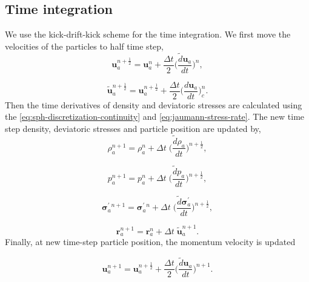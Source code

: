 \documentclass[preprint,12pt]{elsarticle}
\newcommand{\teng}[1]{\ensuremath{\boldsymbol{#1}}}
\newcommand{\ten}[1]{\ensuremath{\mathbf{#1}}}
\begin{document}
\subsection{Time integration}

We use the kick-drift-kick scheme for the time integration. We first move the
velocities of the particles to half time step,
\begin{equation}
  \label{eq:velocity-update-stage-1}
  \ten{u}_a^{n+\frac{1}{2}} = \ten{u}_a^{n} + \frac{\Delta t}{2} \bigg(\frac{\tilde{d}\ten{u}_{a}}{dt}\bigg)^n,
\end{equation}

\begin{equation}
  \label{eq:velocity-hat-update-stage-1}
  \ten{\tilde{u}}_a^{n+\frac{1}{2}} = \ten{u}_a^{n+\frac{1}{2}} + \frac{\Delta t}{2} \bigg(\frac{d\ten{u}_{a}}{dt}\bigg)^{n}_{c}.
\end{equation}
%
Then the time derivatives of density and deviatoric stresses are calculated
using the \cref{eq:sph-discretization-continuity} and
\cref{eq:jaumann-stress-rate}. The new time step density, deviatoric stresses
and particle position are updated by,
\begin{equation}
  \label{eq:density-update-stage-2}
  \rho_{a}^{n+1} = \rho_{a}^{n} + \Delta t \; \bigg(\frac{\tilde{d}\rho_{a}}{dt}\bigg)^{n+\frac{1}{2}},
\end{equation}

\begin{equation}
  \label{eq:pressure-update-stage-2}
  p_{a}^{n+1} = p_{a}^{n} + \Delta t \; \bigg(\frac{\tilde{d}p_{a}}{dt}\bigg)^{n+\frac{1}{2}},
\end{equation}

\begin{equation}
  \label{eq:stress-update-stage-2}
  \teng{\sigma}_{a}^{' \; n+1} = \teng{\sigma}_{a}^{' \; n} +
  \Delta t \; \bigg(\frac{\tilde{d}\teng{\sigma}^{'}_{a}}{dt}\bigg)^{n+\frac{1}{2}},
\end{equation}

\begin{equation}
  \label{eq:position-update-stage-2}
  \ten{r}_{a}^{n+1} = \ten{r}_{a}^{n} + \Delta t \; \ten{\tilde{u}}_{a}^{n+1}.
\end{equation}
%
Finally, at new time-step particle position, the momentum velocity is updated

\begin{equation}
  \label{eq:velocity-update-stage-3}
  \ten{u}_a^{n+1} = \ten{u}_a^{n+\frac{1}{2}} + \frac{\Delta t}{2} \bigg(\frac{\tilde{d}\ten{u}_{a}}{dt}\bigg)^{n+1}.
\end{equation}
\end{document}
